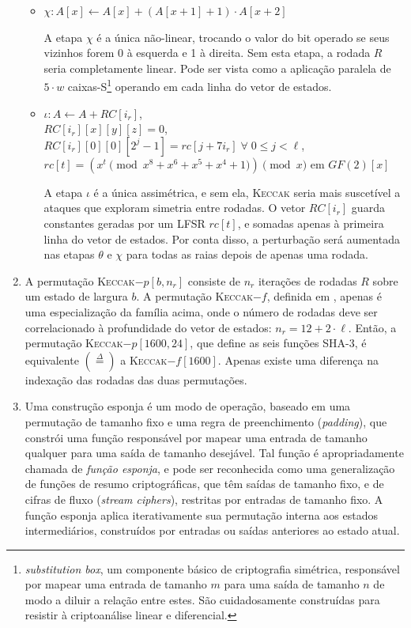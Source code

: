 \documentclass{article}
\begin{document}
\begin{enumerate}[label=(\alph*)]
\begin{itemize}
\item $\chi : A[x] \longleftarrow A[x] + (A[x + 1] + 1) \cdot A[x + 2]$

A etapa $\chi$ é a única não-linear, trocando o valor do bit operado se seus
vizinhos forem 0 à esquerda e 1 à direita. Sem esta etapa, a rodada $R$ seria
completamente linear. Pode ser vista como a aplicação paralela de $5 \cdot w$
caixas-S\footnote{\emph{substitution box}, um componente básico de
criptografia simétrica, responsável por mapear uma entrada de tamanho $m$
para uma saída de tamanho $n$ de modo a diluir a relação entre estes. São
cuidadosamente construídas para resistir à criptoanálise linear e diferencial.}
operando em cada linha do vetor de estados.

\item $\iota : A \longleftarrow A + RC[i_r]$, \\
    $RC[i_r][x][y][z] = 0$, \\
    $RC[i_r][0][0][2^j - 1] = rc[j + 7i_r] \; \forall \; 0 \leq j < \ell$, \\
    $rc[t] = (x^t \pmod{x^8 + x^6 + x^5 + x^4 + 1}) \pmod{x}$ em $GF(2)[x]$

A etapa $\iota$ é a única assimétrica, e sem ela, \textsc{Keccak} seria mais
suscetível a ataques que exploram simetria entre rodadas. O vetor $RC[i_r]$
guarda constantes geradas por um LFSR $rc[t]$, e somadas apenas à primeira
linha do vetor de estados. Por conta disso, a perturbação será aumentada nas
etapas $\theta$ e $\chi$ para todas as raias depois de apenas uma rodada.

\end{itemize}

\item A permutação \textsc{Keccak}$-p[b, n_r]$ consiste de $n_r$ iterações
de rodadas $R$ sobre um estado de largura $b$. A permutação
\textsc{Keccak}$-f$, definida em \cite{KeccakReference}, apenas é uma
especialização da família acima, onde o número de rodadas deve ser
correlacionado à profundidade do vetor de estados: $n_r = 12 + 2 \cdot \ell$.
Então, a permutação \textsc{Keccak}$-p[1600, 24]$, que define as seis funções
SHA-3, é equivalente $(\stackrel{\Delta}{=})$ a \textsc{Keccak}$-f[1600]$.
Apenas existe uma diferença na indexação das rodadas das duas permutações.

\item \label{f} Uma construção esponja é um modo de operação, baseado em uma
permutação de tamanho fixo e uma regra de preenchimento (\emph{padding}), que
constrói uma função responsável por mapear uma entrada de tamanho qualquer
para uma saída de tamanho desejável. Tal função é apropriadamente chamada de
\emph{função esponja}, e pode ser reconhecida como uma generalização de
funções de resumo criptográficas, que têm saídas de tamanho fixo, e de cifras
de fluxo (\emph{stream ciphers}), restritas por entradas de tamanho fixo. A
função esponja aplica iterativamente sua permutação interna aos estados
intermediários, construídos por entradas ou saídas anteriores ao estado atual.


\end{enumerate}
\end{document}
